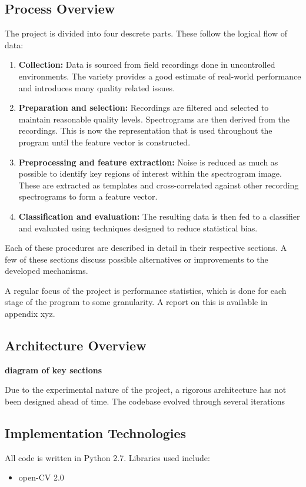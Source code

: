 \subsection{Process Overview}
The project is divided into four descrete parts.
These follow the logical flow of data:
\begin{enumerate}
  \item \textbf{Collection:}
    Data is sourced from field recordings done in uncontrolled environments.
    The variety provides a good estimate of real-world performance and
    introduces many quality related issues.

  \item \textbf{Preparation and selection:}
    Recordings are filtered and selected to maintain reasonable quality levels.
    Spectrograms are then derived from the recordings.
    This is now the representation that is used throughout the program until
    the feature vector is constructed.

  \item \textbf{Preprocessing and feature extraction:}
    Noise is reduced as much as possible to identify key regions of interest
    within the spectrogram image.
    These are extracted as templates and cross-correlated against other
    recording spectrograms to form a feature vector.

  \item \textbf{Classification and evaluation:}
    The resulting data is then fed to a classifier and evaluated using techniques
    designed to reduce statistical bias.
\end{enumerate}

Each of these procedures are described in detail in their respective sections.
A few of these sections discuss possible alternatives or improvements to the
developed mechanisms.

A regular focus of the project is performance statistics, which is done for each
stage of the program to some granularity.
A report on this is available in appendix xyz.

\subsection{Architecture Overview}
\textbf{diagram of key sections}

Due to the experimental nature of the project, a rigorous architecture has not
been designed ahead of time.
The codebase evolved through several iterations 


\subsection{Implementation Technologies}
All code is written in Python 2.7.
Libraries used include:
\begin{itemize}
  \item open-CV 2.0
\end{itemize}
